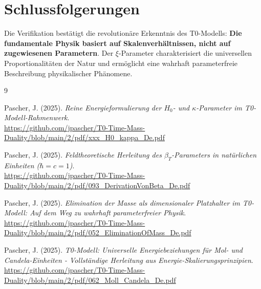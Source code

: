 \documentclass[12pt,a4paper]{article}
\begin{document}
	\section{Schlussfolgerungen}
	
	Die Verifikation bestätigt die revolutionäre Erkenntnis des T0-Modells: \textbf{Die fundamentale Physik basiert auf Skalenverhältnissen, nicht auf zugewiesenen Parametern}. Der $\xi$-Parameter charakterisiert die universellen Proportionalitäten der Natur und ermöglicht eine wahrhaft parameterfreie Beschreibung physikalischer Phänomene.
	
	\begin{thebibliography}{9}
		
		Pascher, J. (2025). \textit{Reine Energieformulierung der $H_0$- und $\kappa$-Parameter im T0-Modell-Rahmenwerk}. \\
		\url{https://github.com/jpascher/T0-Time-Mass-Duality/blob/main/2/pdf/xxx_H0_kappa_De.pdf}
		
		Pascher, J. (2025). \textit{Feldtheoretische Herleitung des $\beta_T$-Parameters in natürlichen Einheiten ($\hbar = c = 1$)}. \\
		\url{https://github.com/jpascher/T0-Time-Mass-Duality/blob/main/2/pdf/093_DerivationVonBeta_De.pdf}
		
		Pascher, J. (2025). \textit{Elimination der Masse als dimensionaler Platzhalter im T0-Modell: Auf dem Weg zu wahrhaft parameterfreier Physik}. \\
		\url{https://github.com/jpascher/T0-Time-Mass-Duality/blob/main/2/pdf/052_EliminationOfMass_De.pdf}
		
		Pascher, J. (2025). \textit{T0-Modell: Universelle Energiebeziehungen für Mol- und Candela-Einheiten - Vollständige Herleitung aus Energie-Skalierungsprinzipien}. \\
		\url{https://github.com/jpascher/T0-Time-Mass-Duality/blob/main/2/pdf/062_Moll_Candela_De.pdf}
		
	\end{thebibliography}
	
\end{document}
